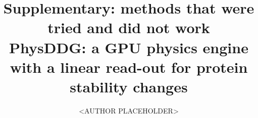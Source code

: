 \documentclass[11pt,a4paper]{article}
\title{Supplementary: methods that were tried and did not work\\[2mm]
\large PhysDDG: a GPU physics engine with a linear read-out for protein stability changes}
\author{<AUTHOR PLACEHOLDER>}
\date{}
\begin{document}
\maketitle
\sloppy
\end{document}
